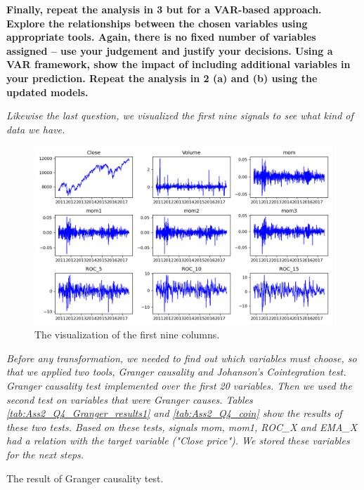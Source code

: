 \item \textbf{Finally, repeat the analysis in 3 but for a VAR-based approach. Explore the relationships between the chosen variables using appropriate tools. Again, there is no fixed number of variables assigned – use your judgement and justify your decisions.  Using a VAR framework, show the impact of including additional variables in your prediction. Repeat the analysis in 2 (a) and (b) using the updated models.} 

\textit{Likewise the last question, we visualized the first nine signals to see what kind of data we have.} 

\begin{figure}[H]
    \centering
    \begin{minipage}[b]{1\textwidth}
        \includegraphics[width=\textwidth]{figures/Ass2/Ass2_Q3_raw_signal.png}
    \end{minipage}
    \caption{The visualization of the first nine columns.}
    \label{fig:Ass2_Q4_raw_signal}
\end{figure}


\textit{Before any transformation, we needed to find out which variables must choose, so that we applied two tools, Granger causality and Johanson's Cointegration test. Granger causality test implemented over the first 20 variables. Then we used the second test on variables that were Granger causes. Tables \ref{tab:Ass2_Q4_Granger_results1} and \ref{tab:Ass2_Q4_coin} show the results of these two tests.
Based on these tests, signals mom, mom1, ROC\_X and EMA\_X had a relation with the target variable ("Close price"). We stored these variables for the next steps.}

\begin{table}[H]
\centering
\caption{The result of Granger causality test.}
\label{tab:Ass2_Q4_Granger_results1}

\end{table}


